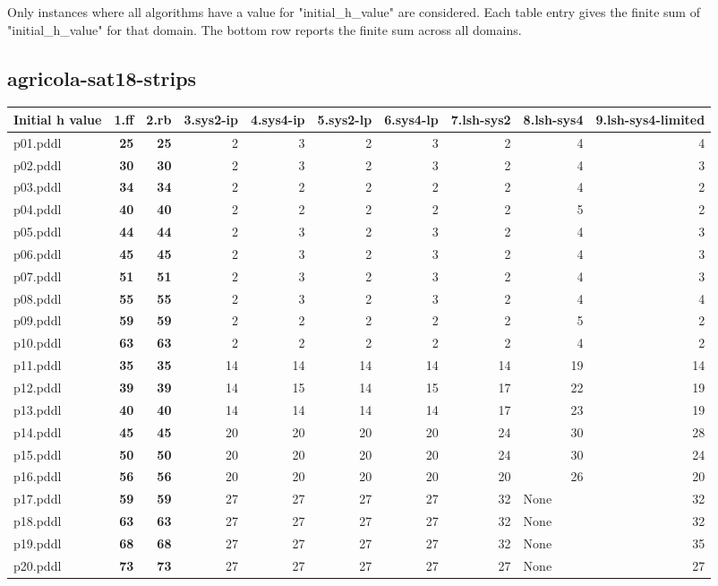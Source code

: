 \documentclass{article}
\begin{document}
Only instances where all algorithms have a value for "initial\_h\_value" are considered. Each table entry gives the finite sum of "initial\_h\_value" for that domain. The bottom row reports the finite sum across all domains.

\hypertarget{initial_h_value-agricola-sat18-strips}{}
\subsection*{agricola-sat18-strips}

\begin{tabular}{@{}lrrrrrrrrr@{}}
Initial h value & 1.ff & 2.rb & 3.sys2-ip & 4.sys4-ip & 5.sys2-lp & 6.sys4-lp & 7.lsh-sys2 & 8.lsh-sys4 & 9.lsh-sys4-limited \\
\midrule
p01.pddl & \textbf{25} & \textbf{25} & 2 & 3 & 2 & 3 & 2 & 4 & 4 \\
p02.pddl & \textbf{30} & \textbf{30} & 2 & 3 & 2 & 3 & 2 & 4 & 3 \\
p03.pddl & \textbf{34} & \textbf{34} & 2 & 2 & 2 & 2 & 2 & 4 & 2 \\
p04.pddl & \textbf{40} & \textbf{40} & 2 & 2 & 2 & 2 & 2 & 5 & 2 \\
p05.pddl & \textbf{44} & \textbf{44} & 2 & 3 & 2 & 3 & 2 & 4 & 3 \\
p06.pddl & \textbf{45} & \textbf{45} & 2 & 3 & 2 & 3 & 2 & 4 & 3 \\
p07.pddl & \textbf{51} & \textbf{51} & 2 & 3 & 2 & 3 & 2 & 4 & 3 \\
p08.pddl & \textbf{55} & \textbf{55} & 2 & 3 & 2 & 3 & 2 & 4 & 4 \\
p09.pddl & \textbf{59} & \textbf{59} & 2 & 2 & 2 & 2 & 2 & 5 & 2 \\
p10.pddl & \textbf{63} & \textbf{63} & 2 & 2 & 2 & 2 & 2 & 4 & 2 \\
p11.pddl & \textbf{35} & \textbf{35} & 14 & 14 & 14 & 14 & 14 & 19 & 14 \\
p12.pddl & \textbf{39} & \textbf{39} & 14 & 15 & 14 & 15 & 17 & 22 & 19 \\
p13.pddl & \textbf{40} & \textbf{40} & 14 & 14 & 14 & 14 & 17 & 23 & 19 \\
p14.pddl & \textbf{45} & \textbf{45} & 20 & 20 & 20 & 20 & 24 & 30 & 28 \\
p15.pddl & \textbf{50} & \textbf{50} & 20 & 20 & 20 & 20 & 24 & 30 & 24 \\
p16.pddl & \textbf{56} & \textbf{56} & 20 & 20 & 20 & 20 & 20 & 26 & 20 \\
p17.pddl & \textbf{59} & \textbf{59} & 27 & 27 & 27 & 27 & 32 & \multicolumn{1}{|l|}{None} & 32 \\
p18.pddl & \textbf{63} & \textbf{63} & 27 & 27 & 27 & 27 & 32 & \multicolumn{1}{|l|}{None} & 32 \\
p19.pddl & \textbf{68} & \textbf{68} & 27 & 27 & 27 & 27 & 32 & \multicolumn{1}{|l|}{None} & 35 \\
p20.pddl & \textbf{73} & \textbf{73} & 27 & 27 & 27 & 27 & 27 & \multicolumn{1}{|l|}{None} & 27 \\
\end{tabular}
\end{document}
